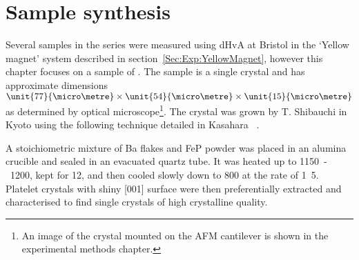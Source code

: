 \section{Sample synthesis}

Several samples in the \BaFeAsP{} series were measured using \ac{dHvA} at Bristol in the `Yellow magnet' system described in section~\ref{Sec:Exp:YellowMagnet}, however this chapter focuses on a sample of \BaFeP. The sample is a single crystal and has approximate dimensions $\unit{77}{\micro\metre}\times\unit{54}{\micro\metre}\times \unit{15}{\micro\metre}$ as determined by optical microscope\footnote{An image of the crystal mounted on the \ac{AFM} cantilever is shown in the experimental methods chapter.}. The crystal was grown by T. Shibauchi in Kyoto using the following technique detailed in Kasahara \etal~\cite{Kasahara2010}. 

A stoichiometric mixture of Ba flakes and FeP powder was placed in an alumina crucible and sealed in an evacuated quartz tube. It was heated up to \unit{1150-1200}{\celsius}, kept for \unit{12}{\hour}, and then cooled slowly down to \unit{800}{\celsius} at the rate of \unit{1.5}{\celsius\per\hour}. Platelet crystals with shiny [001] surface were then preferentially extracted and characterised to find single crystals of high crystalline quality.

